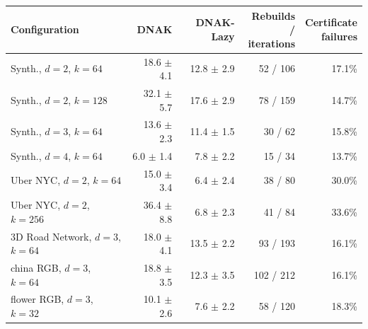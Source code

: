 \begin{tabular}{lrrrr}
\toprule
Configuration & DNAK & DNAK-Lazy & \shortstack[r]{Rebuilds /\\ iterations} & \shortstack[r]{Certificate\\ failures} \\
\midrule
Synth., $d{=}2$, $k{=}64$ & 18.6 $\pm$ 4.1 & 12.8 $\pm$ 2.9 & 52 / 106 & 17.1\% \\
Synth., $d{=}2$, $k{=}128$ & 32.1 $\pm$ 5.7 & 17.6 $\pm$ 2.9 & 78 / 159 & 14.7\% \\
Synth., $d{=}3$, $k{=}64$ & 13.6 $\pm$ 2.3 & 11.4 $\pm$ 1.5 & 30 / 62 & 15.8\% \\
Synth., $d{=}4$, $k{=}64$ & 6.0 $\pm$ 1.4 & 7.8 $\pm$ 2.2 & 15 / 34 & 13.7\% \\
Uber NYC, $d{=}2$, $k{=}64$ & 15.0 $\pm$ 3.4 & 6.4 $\pm$ 2.4 & 38 / 80 & 30.0\% \\
Uber NYC, $d{=}2$, $k{=}256$ & 36.4 $\pm$ 8.8 & 6.8 $\pm$ 2.3 & 41 / 84 & 33.6\% \\
3D Road Network, $d{=}3$, $k{=}64$ & 18.0 $\pm$ 4.1 & 13.5 $\pm$ 2.2 & 93 / 193 & 16.1\% \\
china RGB, $d{=}3$, $k{=}64$ & 18.8 $\pm$ 3.5 & 12.3 $\pm$ 3.5 & 102 / 212 & 16.1\% \\
flower RGB, $d{=}3$, $k{=}32$ & 10.1 $\pm$ 2.6 & 7.6 $\pm$ 2.2 & 58 / 120 & 18.3\% \\
\bottomrule
\end{tabular}
